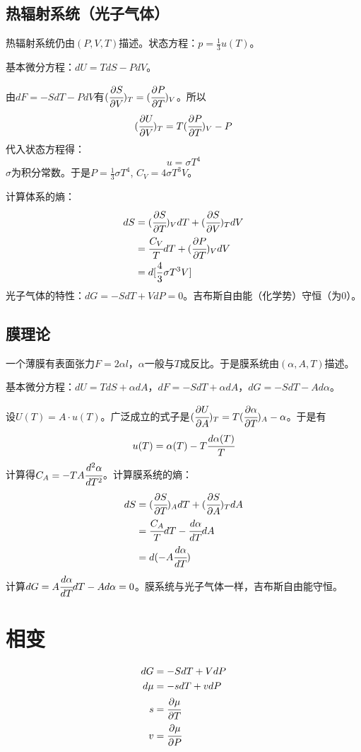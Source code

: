 \documentclass[a4paper,12pt]{article}
\newcommand{\myp}[3]{(\cfrac{\partial{#1}}{\partial{#2}})_{#3}}
\begin{document}
\subsection{热辐射系统（光子气体）}
热辐射系统仍由$(P,V,T)$描述。状态方程：$p = \frac{1}{3}u(T)$。\par
基本微分方程：$dU = TdS - PdV$。\par
由$dF = -SdT - PdV$有$\myp{S}{V}{T} = \myp{P}{T}{V}$。所以
\begin{equation}
\myp{U}{V}{T} = T\myp{P}{T}{V} - P
\end{equation}
代入状态方程得：
\begin{equation}
u = \sigma T^4
\end{equation}
$\sigma$为积分常数。于是$P = \frac{1}{3}\sigma T^4$, $C_V = 4 \sigma T^3 V$。\par
计算体系的熵：
\begin{subequations}
\begin{align*}
dS &= \myp{S}{T}{V}dT + \myp{S}{V}{T} dV \\
   &= \cfrac{C_V}{T}dT + \myp{P}{T}{V}dV \\
   & = d[\frac{4}{3}\sigma T^3 V] \\
\end{align*}
\end{subequations}
\indent 光子气体的特性：$dG = -SdT + VdP = 0$。吉布斯自由能（化学势）守恒（为$0$）。

\subsection{膜理论}
一个薄膜有表面张力$F = 2 \alpha l$，$\alpha$一般与$T$成反比。于是膜系统由$(\alpha, A, T)$描述。\par
基本微分方程：$dU = TdS + \alpha dA$，$dF = -SdT + \alpha dA$，$dG = -SdT - Ad\alpha$。\par
设$U(T) = A \cdot u(T)$。广泛成立的式子是$\myp{U}{A}{T} = T\myp{\alpha}{T}{A} - \alpha$。于是有
\begin{equation}
u(T) = \alpha(T) - T\cfrac{d\alpha(T)}{T}
\end{equation}
计算得$C_A = -TA\cfrac{d^2\alpha}{dT^2}$。计算膜系统的熵：
\begin{subequations}
\begin{align*}
dS &= \myp{S}{T}{A}dT + \myp{S}{A}{T} dA \\
   &= \cfrac{C_A}{T}dT - \cfrac{d\alpha}{dT}dA \\
   &= d(- A \cfrac{d\alpha}{dT}) \\
\end{align*}
\end{subequations}
计算$dG = A \cfrac{d\alpha}{dT} dT - A d\alpha = 0$。膜系统与光子气体一样，吉布斯自由能守恒。


\section{相变}
\begin{subequations}
\begin{align*}
dG &= -S dT + V dP \\
d\mu &= -s dT + v dP \\
s &= \cfrac{\partial \mu}{\partial T} \\
v &= \cfrac{\partial \mu}{\partial P} \\
\end{align*}
\end{subequations}
\end{document}
